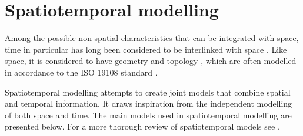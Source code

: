 \section{Spatiotemporal modelling}
\label{se:modelling-time}

Among the possible non-spatial characteristics that can be integrated with space, time in particular has long been considered to be interlinked with space \citep{Akhundov86}.
Like space, it is considered to have geometry and topology \citep{Earman77}, which are often modelled in accordance to the ISO 19108 standard \citep{ISO19108:2002}.

Spatiotemporal modelling attempts to create joint models that combine spatial and temporal information.
It draws inspiration from the independent modelling of both space and time.
The main models used in spatiotemporal modelling are presented below.
For a more thorough review of spatiotemporal models see \citet{Al-Taha94,Pelekis04}.

